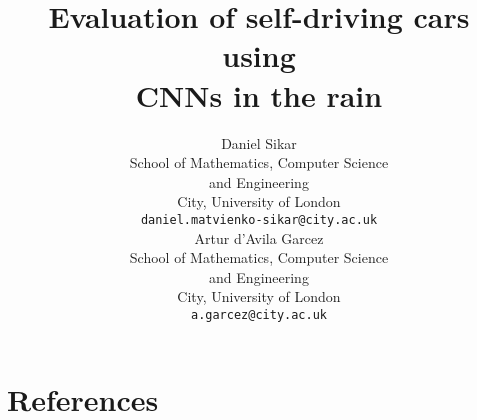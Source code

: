 \documentclass{article}
\title{Evaluation of self-driving cars using \\ CNNs in the rain}
\author{
    Daniel Sikar \\
    School of Mathematics, Computer Science \\ and Engineering \\
    City, University of London \\
    \texttt{daniel.matvienko-sikar@city.ac.uk} \\
    \And
    Artur d’Avila Garcez  \\
    School of Mathematics, Computer Science \\ and Engineering \\
    City, University of London\\
    \texttt{a.garcez@city.ac.uk} \\
}
\begin{document}
\maketitle















\section*{References}
\medskip
{
    \small
    \printbibliography
}


\end{document}
